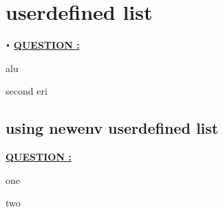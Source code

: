 \documentclass[12pt]{article}
\newenvironment{Question}
{\begin{list}
		{
			\large\underline{\textbf{QUESTION \arabic{N}:}}
		}{
			\usecounter{N}
			\setlength{\leftmargin}{1cm}
		}}{\end{list}}
\newcounter{N}
\begin{document}
	\section{userdefined list}
		\begin{list}\texttt{•}
		{
			\large\underline{\textbf{QUESTION :}}
		}{
			\setlength{\leftmargin}{1cm}
		}
			\item alu
			\item second eri
		\end{list}

	\subsection{using newenv userdefined list}
		\begin{Question}
			\item one
			\item two
		\end{Question}
\end{document}
